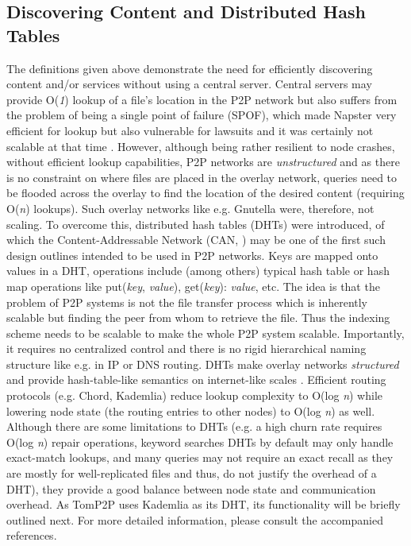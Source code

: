 \subsection{Discovering Content and Distributed Hash Tables}
The definitions given above demonstrate the need for efficiently discovering content and/or services without using a central server. Central servers may provide O(\textit{1}) lookup of a file's location in the P2P network but also suffers from the problem of being a single point of failure (SPOF), which made Napster very efficient for lookup but also vulnerable for lawsuits \cite{Chawathe2003} and it was certainly not scalable at that time \cite{Ratnasamy:2001:SCN:964723.383072}. However, although being rather resilient to node crashes, without efficient lookup capabilities, P2P networks are \textit{unstructured} and as there is no constraint on where files are placed in the overlay network, queries need to be flooded across the overlay to find the location of the desired content (requiring O(\textit{n}) lookups). Such overlay networks like e.g. Gnutella were, therefore, not scaling. To overcome this, distributed hash tables (DHTs) were introduced, of which the Content-Addressable Network (CAN, \cite{Ratnasamy:2001:SCN:964723.383072}) may be one of the first such design outlines intended to be used in P2P networks. Keys are mapped onto values in a DHT, operations include (among others) typical hash table or hash map operations like put(\textit{key}, \textit{value}), get(\textit{key}): \textit{value}, etc. The idea is that the problem of P2P systems is not the file transfer process which is inherently scalable but finding the peer from whom to retrieve the file\cite{Ratnasamy:2001:SCN:964723.383072}. Thus the indexing scheme needs to be scalable to make the whole P2P system scalable. Importantly, it requires no centralized control and there is no rigid hierarchical naming structure like e.g. in IP or DNS routing. DHTs make overlay networks \textit{structured} and provide hash-table-like semantics on internet-like scales \cite{Ratnasamy:2001:SCN:964723.383072}. Efficient routing protocols (e.g. Chord\cite{Stoica2001}, Kademlia\cite{Maymounkov:2002:KPI:646334.687801}) reduce lookup complexity to O(log \textit{n}) while lowering node state (the routing entries to other nodes) to O(log \textit{n}) as well. Although there are some limitations to DHTs (e.g. a high churn rate requires O(log \textit{n}) repair operations, keyword searches DHTs by default may only handle exact-match lookups, and many queries may not require an exact recall as they are mostly for well-replicated files and thus, do not justify the overhead of a DHT\cite{Chawathe2003}), they provide a good balance between node state and communication overhead. As TomP2P uses Kademlia as its DHT, its functionality will be briefly outlined next. For more detailed information, please consult the accompanied references.

